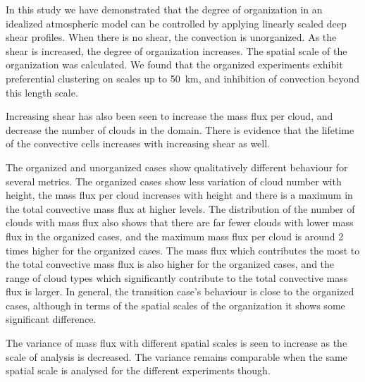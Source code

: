\documentclass[11pt,a4paper]{article}
\newcommand\todo[1]{\textbf{TODO: #1}}
\begin{document}



In this study we have demonstrated that the degree of organization in an idealized atmospheric model can be controlled by applying linearly scaled deep shear profiles. When there is no shear, the convection is unorganized. As the shear is increased, the degree of organization increases. The spatial scale of the organization was calculated. We found that the organized experiments exhibit preferential clustering on scales up to \SI{50}{km}, and inhibition of convection beyond this length scale.

Increasing shear has also been seen to increase the mass flux per cloud, and decrease the number of clouds in the domain. There is evidence that the lifetime of the convective cells increases with increasing shear as well.

The organized and unorganized cases show qualitatively different behaviour for several metrics. The organized cases show less variation of cloud number with height, the mass flux per cloud increases with height and there is a maximum in the total convective mass flux at higher levels. The distribution of the number of clouds with mass flux also shows that there are far fewer clouds with lower mass flux in the organized cases, and the maximum mass flux per cloud is around 2 times higher for the organized cases. The mass flux which contributes the most to the total convective mass flux is also higher for the organized cases, and the range of cloud types which significantly contribute to the total convective mass flux is larger. In general, the transition case's behaviour is close to the organized cases, although in terms of the spatial scales of the organization it shows some significant difference.

The variance of mass flux with different spatial scales is seen to increase as the scale of analysis is decreased. The variance remains comparable when the same spatial scale is analysed for the different experiments though.
\end{document}
